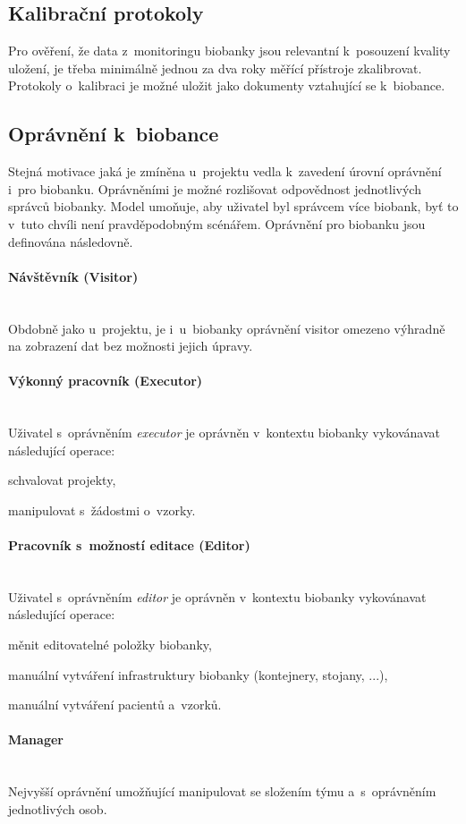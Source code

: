 \documentclass[11pt, final, oneside]{fithesis2}
\newcommand{\paragraphNewLine}[1]{\paragraph*{#1}\mbox{}\\}
\begin{document}
\subsection{Kalibrační protokoly}
Pro ověření, že data z~monitoringu biobanky jsou relevantní k~posouzení kvality uložení, je třeba minimálně jednou za dva roky měřící přístroje zkalibrovat. Protokoly o~kalibraci je možné uložit jako dokumenty vztahující se k~biobance.


\subsection{Oprávnění k~biobance}\label{chapter:proposal:subsection:biobankPermission}
Stejná motivace jaká je zmíněna u~projektu vedla k~zavedení úrovní oprávnění i~pro biobanku. Oprávněními je možné rozlišovat odpovědnost jednotlivých správců biobanky. Model umoňuje, aby uživatel byl správcem více biobank, byť to v~tuto chvíli není pravděpodobným scénářem.
Oprávnění pro biobanku jsou definována následovně.

\paragraphNewLine{Návštěvník (Visitor)} 
Obdobně jako u~projektu, je i~u~biobanky oprávnění visitor omezeno výhradně na zobrazení dat bez možnosti jejich úpravy. 

\paragraphNewLine{Výkonný pracovník (Executor)}
Uživatel s~oprávněním \textit{executor} je oprávněn v~kontextu biobanky vykovánavat následující operace:
\begin{compactitem}
	\item schvalovat projekty,
	\item manipulovat s~žádostmi o~vzorky.
\end{compactitem}

\paragraphNewLine{Pracovník s~možností editace (Editor)} 
Uživatel s~oprávněním \textit{editor} je oprávněn v~kontextu biobanky vykovánavat následující operace:
\begin{compactitem}
	\item měnit editovatelné položky biobanky,
	\item manuální vytváření infrastruktury biobanky (kontejnery, stojany, ...),
	\item manuální vytváření pacientů a~vzorků.
\end{compactitem}

\paragraphNewLine{Manager}
Nejvyšší oprávnění umožňující manipulovat se složením týmu a~s~oprávněním jednotlivých osob.
\end{document}

